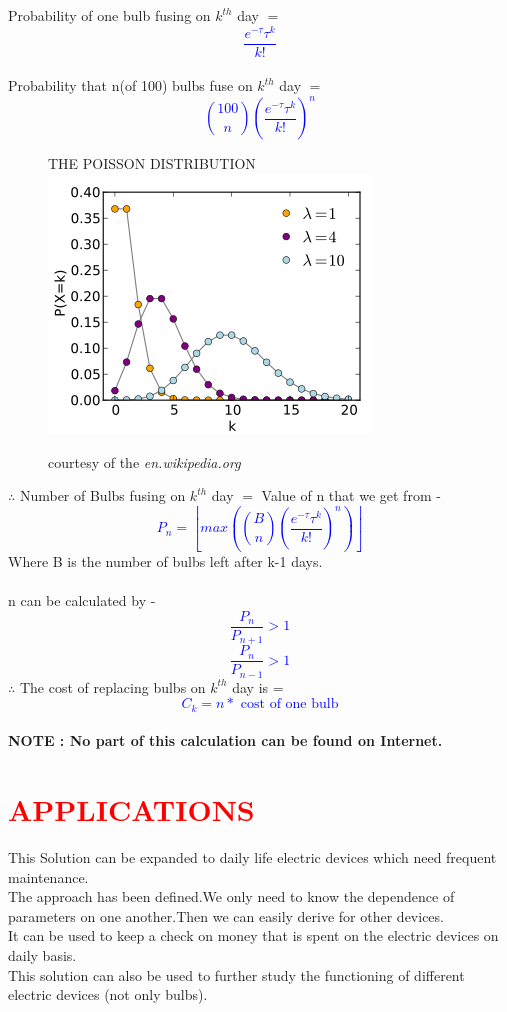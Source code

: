 \documentclass[a4paper]{article}
\begin{document}
\huge{Probability of one bulb fusing on $k^{th}$ day $=$
\textcolor{blue}{$$\frac{e^{-\tau} \tau^k}{k!}$$} \\
Probability that n(of 100) bulbs fuse on $k^{th}$ day $=$
    \textcolor{blue}{$$\binom{100}{n}(\frac{e^{-\tau} \tau^k}{k!})^n$$}
\begin{figure}[h!]
\begin{center}
THE POISSON DISTRIBUTION
\includegraphics[width=\linewidth]{Poisson.png}
\end{center}
\caption{\huge{courtesy of the \textit{en.wikipedia.org}}}
\label{fig:bulb3}
\end{figure}
\newpage
$\therefore$ Number of Bulbs fusing on $k^{th}$ day $=$
Value of n that we get from - \\
\textcolor{blue}{$$P_n=\left \lfloor{max(\binom{B}{n}(\frac{e^{-\tau} \tau^k}{k!})^n)}\right \rfloor$$}
Where B is the number of bulbs left after k-1 days.\\
\vspace{1 cm}\\
n can be calculated by -
\textcolor{blue}{\textbf{$$\frac{P_n}{P_{n+1}}>1$$}}
\textcolor{blue}{\textbf{$$\frac{P_n}{P_{n-1}}>1$$}}
$\therefore$ The cost of replacing bulbs on $k^{th}$ day is =\\
\textcolor{blue}{\textbf{\huge{$$C_k=n * \mbox{ cost of one bulb}$$}}}
\vspace*{\fill}\\
\large{\textbf{NOTE : No part of this calculation can be found on Internet.}
}
\newpage
\section{\huge{\textcolor{red}{APPLICATIONS}}}
\LARGE{This Solution can be expanded to daily life electric devices which need frequent maintenance.\\
The approach has been defined.We only need to know the dependence of parameters on one another.Then we can easily derive for other devices.\\ It can be used to keep a check on money that is spent on the electric devices on daily basis.\\
This solution can also be used to further study the functioning of different electric devices (not only bulbs).}
}
\end{document}
